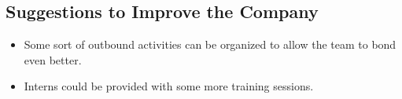 \subsection{Suggestions to Improve the Company}
\begin{itemize}
    \item Some sort of outbound activities can be organized to allow the team to bond even better.
    \item Interns could be provided with some more training sessions.
\end{itemize}